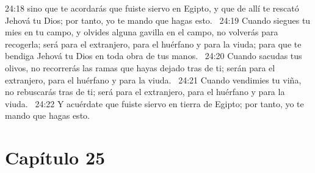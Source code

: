 24:18 sino que te acordarás que fuiste siervo en Egipto, y que de allí te rescató Jehová tu Dios; por tanto, yo te mando que hagas esto.  
24:19 Cuando siegues tu mies en tu campo, y olvides alguna gavilla en el campo, no volverás para recogerla; será para el extranjero, para el huérfano y para la viuda; para que te bendiga Jehová tu Dios en toda obra de tus manos.  
24:20 Cuando sacudas tus olivos, no recorrerás las ramas que hayas dejado tras de ti; serán para el extranjero, para el huérfano y para la viuda.  
24:21 Cuando vendimies tu viña, no rebuscarás tras de ti; será para el extranjero, para el huérfano y para la viuda.  
24:22 Y acuérdate que fuiste siervo en tierra de Egipto; por tanto, yo te mando que hagas esto.  
\section*{Capítulo 25 }

